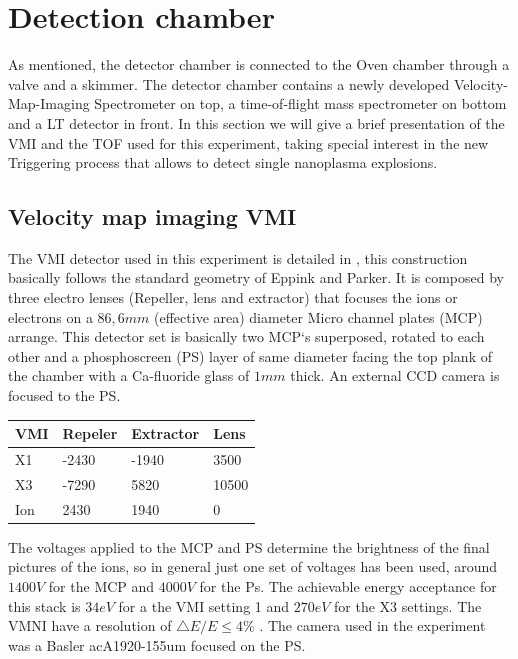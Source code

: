 \section{Detection chamber}

As mentioned, the detector chamber is connected to the Oven chamber through a valve and a skimmer. The detector chamber contains a newly developed Velocity-Map-Imaging
Spectrometer on top, a time-of-flight mass spectrometer on bottom and a LT detector in front. In this section we will give a brief presentation of the VMI and the TOF used for this experiment, taking special interest in the new Triggering process that allows to detect single nanoplasma explosions. 
 
\subsection{Velocity map imaging VMI}

The VMI detector used in this experiment is detailed in \cite{schomas_compact_2017}, this construction basically follows the standard geometry of Eppink and Parker\cite{eppink_velocity_1997}. It is composed by three electro lenses (Repeller, lens and extractor) that focuses the ions or electrons on a $86,6mm$ (effective area) diameter Micro channel plates (MCP) arrange. This detector set is basically  two MCP`s superposed,  rotated to each other and a phosphoscreen (PS) layer of same diameter facing the top plank of the chamber with a Ca-fluoride glass of $1mm$ thick. An external CCD camera is focused to the PS. 

\begin{table}[]
\centering
\begin{tabular}{|l|l|l|l|}
\hline
\rowcolor[HTML]{EFEFEF} 
VMI & Repeler & Extractor & Lens  \\ \hline
X1  & -2430   & -1940     & 3500  \\ \hline
X3  & -7290   & 5820      & 10500 \\ \hline
Ion & 2430    & 1940      & 0     \\ \hline
\end{tabular}
\end{table}

The voltages applied to the MCP and PS determine the brightness of the final pictures of the ions, so in general just one set of voltages has been used, around $1400V$ for the MCP and $4000V$ for the Ps. The achievable energy acceptance for this stack is $34eV$ for a the VMI setting 1 and $270 eV$ for the X3 settings. The VMNI have a resolution of $\bigtriangleup E / E\leq 4\%$ \cite{schomas_compact_2017}. The camera used in the experiment was a Basler acA1920-155um focused on the PS.

